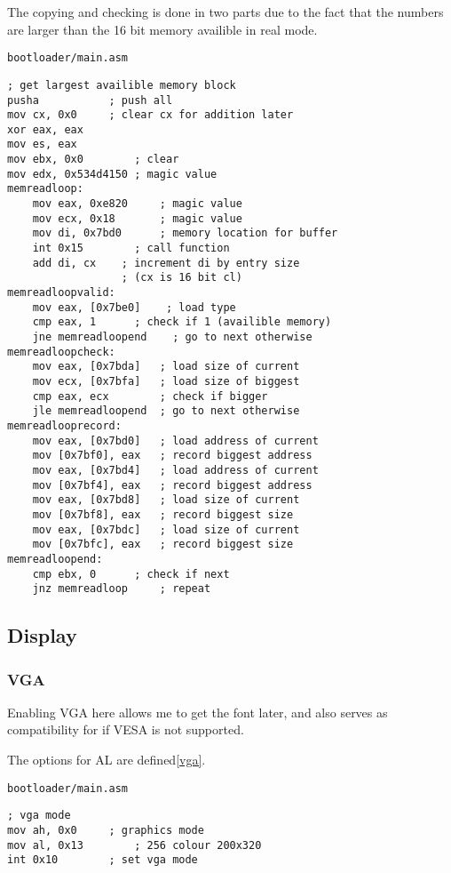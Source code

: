 \documentclass{article}
\begin{document}
The copying and checking is done in two parts due to the fact
that the numbers are larger than the 16 bit memory availible in real mode.

\begin{verbatim}
bootloader/main.asm
\end{verbatim}
\begin{verbatim}
; get largest availible memory block
pusha			; push all
mov cx, 0x0		; clear cx for addition later
xor eax, eax
mov es, eax
mov ebx, 0x0		; clear
mov edx, 0x534d4150	; magic value
memreadloop:
	mov eax, 0xe820	    ; magic value
	mov ecx, 0x18	    ; magic value
	mov di, 0x7bd0	    ; memory location for buffer
	int 0x15	    ; call function
	add di, cx    ; increment di by entry size
	              ; (cx is 16 bit cl)
memreadloopvalid:
	mov eax, [0x7be0]    ; load type
	cmp eax, 1	    ; check if 1 (availible memory)
	jne memreadloopend    ; go to next otherwise
memreadloopcheck:
	mov eax, [0x7bda]	; load size of current
	mov ecx, [0x7bfa]	; load size of biggest
	cmp eax, ecx		; check if bigger
	jle memreadloopend	; go to next otherwise
memreadlooprecord:
	mov eax, [0x7bd0]	; load address of current
	mov [0x7bf0], eax	; record biggest address
	mov eax, [0x7bd4]	; load address of current
	mov [0x7bf4], eax	; record biggest address
	mov eax, [0x7bd8]	; load size of current
	mov [0x7bf8], eax	; record biggest size
	mov eax, [0x7bdc]	; load size of current
	mov [0x7bfc], eax	; record biggest size
memreadloopend:
	cmp ebx, 0		; check if next
	jnz memreadloop		; repeat
\end{verbatim}

\subsection{Display}

\subsubsection{VGA}

Enabling VGA\cite{vga} here allows me to get the font later,
and also serves as compatibility for if VESA is not supported.

The options for AL are defined\ref{vga}.

\begin{verbatim}
bootloader/main.asm
\end{verbatim}
\begin{verbatim}
; vga mode
mov ah, 0x0		; graphics mode
mov al, 0x13		; 256 colour 200x320
int 0x10		; set vga mode
\end{verbatim}
\end{document}
